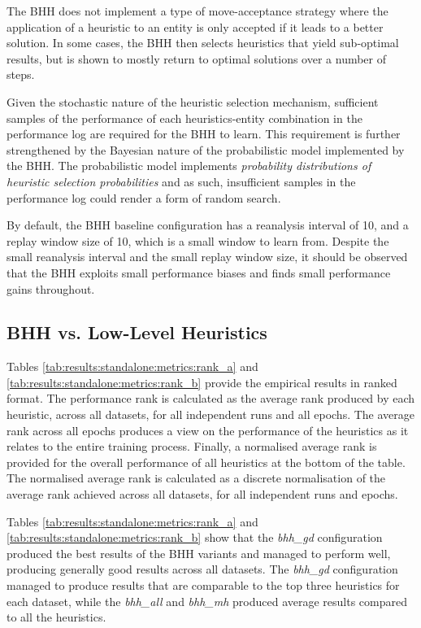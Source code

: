 \documentclass[preprint,review,12pt]{elsarticle}
\begin{document}
The \acs{BHH} does not implement a type of move-acceptance strategy where the application of a heuristic to an entity is only accepted if it leads to a better solution. In some cases, the \acs{BHH} then selects heuristics that yield sub-optimal results, but is shown to mostly return to optimal solutions over a number of steps.

Given the stochastic nature of the heuristic selection mechanism, sufficient samples of the performance of each heuristics-entity combination in the performance log are required for the \acs{BHH} to learn. This requirement is further strengthened by the Bayesian nature of the probabilistic model implemented by the \acs{BHH}. The probabilistic model implements \textit{probability distributions of heuristic selection probabilities} and as such, insufficient samples in the performance log could render a form of random search.

By default, the \acs{BHH} baseline configuration has a reanalysis interval of 10, and a replay window size of 10, which is a small window to learn from. Despite the small reanalysis interval and the small replay window size, it should be observed that the \acs{BHH} exploits small performance biases and finds small performance gains throughout.

\subsection{BHH vs. Low-Level Heuristics}\label{sec:results:standalone}

Tables \ref{tab:results:standalone:metrics:rank_a} and \ref{tab:results:standalone:metrics:rank_b} provide the empirical results in ranked format. The performance rank is calculated as the average rank produced by each heuristic, across all datasets, for all independent runs and all epochs. The average rank across all epochs produces a view on the performance of the heuristics as it relates to the entire training process. Finally, a normalised average rank is provided for the overall performance of all heuristics at the bottom of the table. The normalised average rank is calculated as a discrete normalisation of the average rank achieved across all datasets, for all independent runs and epochs.

Tables \ref{tab:results:standalone:metrics:rank_a} and \ref{tab:results:standalone:metrics:rank_b} show that the \textit{bhh\_gd} configuration produced the best results of the \acs{BHH} variants and managed to perform well, producing generally good results across all datasets. The \textit{bhh\_gd} configuration managed to produce results that are comparable to the top three heuristics for each dataset, while the \textit{bhh\_all} and \textit{bhh\_mh} produced average results compared to all the heuristics.
\end{document}

